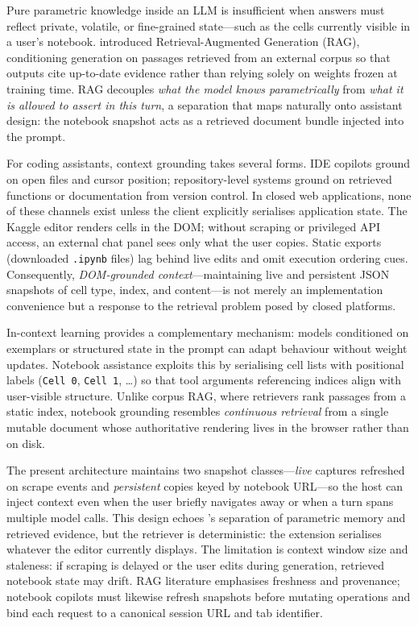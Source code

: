 Pure parametric knowledge inside an \ac{LLM} is insufficient when answers must reflect private, volatile, or fine-grained state---such as the cells currently visible in a user's notebook. \textcite{lewis2020rag} introduced Retrieval-Augmented Generation (\ac{RAG}), conditioning generation on passages retrieved from an external corpus so that outputs cite up-to-date evidence rather than relying solely on weights frozen at training time. \ac{RAG} decouples \emph{what the model knows parametrically} from \emph{what it is allowed to assert in this turn}, a separation that maps naturally onto assistant design: the notebook snapshot acts as a retrieved document bundle injected into the prompt.

For coding assistants, context grounding takes several forms. IDE copilots ground on open files and cursor position; repository-level systems ground on retrieved functions or documentation from version control. In closed web applications, none of these channels exist unless the client explicitly serialises application state. The Kaggle editor renders cells in the \ac{DOM}; without scraping or privileged \ac{API} access, an external chat panel sees only what the user copies. Static exports (downloaded \texttt{.ipynb} files) lag behind live edits and omit execution ordering cues. Consequently, \emph{DOM-grounded context}---maintaining live and persistent JSON snapshots of cell type, index, and content---is not merely an implementation convenience but a response to the retrieval problem posed by closed platforms.

In-context learning provides a complementary mechanism: models conditioned on exemplars or structured state in the prompt can adapt behaviour without weight updates. Notebook assistance exploits this by serialising cell lists with positional labels (\texttt{Cell 0}, \texttt{Cell 1}, \ldots) so that tool arguments referencing indices align with user-visible structure. Unlike corpus \ac{RAG}, where retrievers rank passages from a static index, notebook grounding resembles \emph{continuous retrieval} from a single mutable document whose authoritative rendering lives in the browser rather than on disk.

The present architecture maintains two snapshot classes---\emph{live} captures refreshed on scrape events and \emph{persistent} copies keyed by notebook URL---so the host can inject context even when the user briefly navigates away or when a turn spans multiple model calls. This design echoes \textcite{lewis2020rag}'s separation of parametric memory and retrieved evidence, but the retriever is deterministic: the extension serialises whatever the editor currently displays. The limitation is context window size and staleness: if scraping is delayed or the user edits during generation, retrieved notebook state may drift. \ac{RAG} literature emphasises freshness and provenance; notebook copilots must likewise refresh snapshots before mutating operations and bind each request to a canonical session URL and tab identifier.

